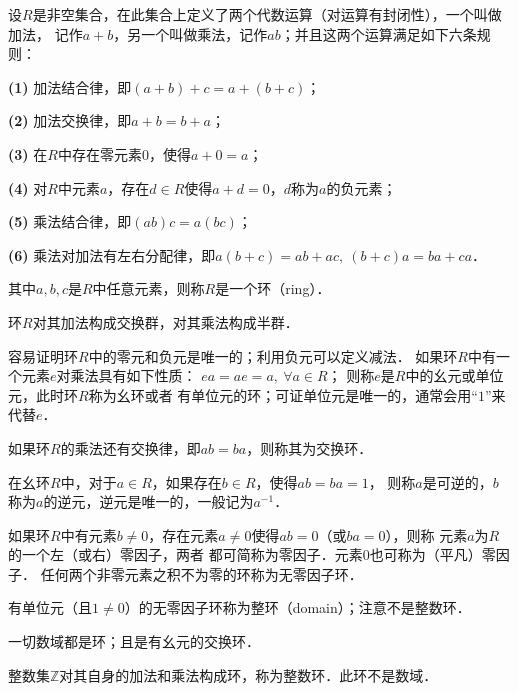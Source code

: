 \begin{definition}\label{chtop:def_ring}
    设$R$是非空集合，在此集合上定义了两个代数运算（对运算有封闭性），一个叫做{\kaishu 加法}，
    记作$a+b$，另一个叫做{\kaishu 乘法}，记作$ab$；并且这两个运算满足如下六条规则：
    
    {\bfseries (1)} 加法结合律，即$(a+b)+c=a+(b+c)$；
    
    {\bfseries (2)} 加法交换律，即$a+b=b+a$；
    
    {\bfseries (3)} 在$R$中存在零元素$0$，使得$a+0=a$；
    
    {\bfseries (4)} 对$R$中元素$a$，存在$d\in R$使得$a+d=0$，$d$称为$a$的负元素；
    
    {\bfseries (5)} 乘法结合律，即$(ab)c=a(bc)$；
    
    {\bfseries (6)} 乘法对加法有左右分配律，即$a(b+c)=ab+ac,\ (b+c)a= ba + ca$．
    
    其中$a,b,c$是$R$中任意元素，则称$R$是一个{\heiti 环}（ring）．
\end{definition}

环$R$对其加法构成交换群，对其乘法构成半群．

容易证明环$R$中的零元和负元是唯一的；利用负元可以定义减法．
如果环$R$中有一个元素$e$对乘法具有如下性质：
$e a = a e  =a, \ \forall a \in R $；
则称$e$是$R$中的{\heiti 幺元}或单位元，此时环$R$称为{\heiti 幺环}或者
有单位元的环；可证单位元是唯一的，通常会用“$1$”来代替$e$．

如果环$R$的乘法还有交换律，即$ab=ba$，则称其为{\heiti 交换环}．

在幺环$R$中，对于$a\in R$，如果存在$b\in R$，使得$ab=ba =1$，
则称$a$是可逆的，$b$称为$a$的逆元，逆元是唯一的，一般记为$a^{-1}$．

如果环$R$中有元素$b\neq 0$，存在元素$a\neq 0$使得$ab=0$（或$ba=0$），则称
元素$a$为$R$的一个{\heiti 左}（或{\heiti 右}）{\heiti 零因子}，两者
都可简称为{\heiti 零因子}．元素0也可称为（平凡）零因子．
任何两个非零元素之积不为零的环称为{\heiti 无零因子环}．

有单位元（且$1\neq 0$）的无零因子环称为{\heiti 整环}（domain）；注意不是整数环．

\begin{example}
    一切数域都是环；且是有幺元的交换环．
\end{example}

\begin{example}
    整数集$\mathbb{Z}$对其自身的加法和乘法构成环，称为{\heiti 整数环}．此环不是数域．
\end{example}

